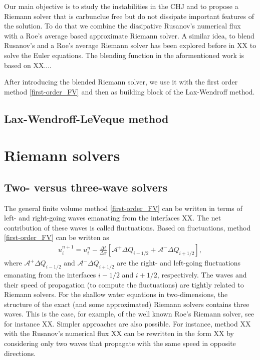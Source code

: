 \documentclass[preprint, 11pt]{article}
\newcommand{\A}{{\mathcal A}}
\begin{document}
Our main objective is to study the instabilities in the CHJ and to propose a Riemann solver
that is carbunclue free but do not dissipate important features of the solution. 
To do that we combine the dissipative Rusanov's numerical flux with a Roe's average based
approximate Riemann solver. A similar idea, to blend Rusanov's and a Roe's average 
Riemann solver has been explored before in XX to solve the Euler equations. The blending 
function in the aformentioned work is based on XX....

After introducing the blended Riemann solver, we use it with the first order method 
\eqref{first-order_FV} and then as building block of the Lax-Wendroff method. 

\subsection{Lax-Wendroff-LeVeque method}

\section{Riemann solvers}

\subsection{Two- versus three-wave solvers}
The general finite volume method \eqref{first-order_FV} can be written in terms of left- 
and right-going waves emanating from the interfaces XX. The net contribution of these waves 
is called fluctuations. Based on fluctuations, method \eqref{first-order_FV} can be written as 
\begin{align}\label{FV_via_fluct}
  u_i^{n+1}=u_i^n-\frac{\Delta t}{\Delta x}\left[\A^+\Delta Q_{i-1/2}+\A^-\Delta Q_{i+1/2}\right],
\end{align}
where $\A^+\Delta Q_{i-1/2}$ and $\A^-\Delta Q_{i+1/2}$ are the right- and left-going fluctuations 
emanating from the interfaces $i-1/2$ and $i+1/2$, respectively.
The waves and their speed of propagation (to compute the fluctuations) are tightly related to 
Riemann solvers. For the shallow water equations in two-dimensions, the structure of the exact (and some 
approximated) Riemann solvers contains three waves. This is the case, for example, of the well known 
Roe's Riemann solver, see for instance XX. Simpler approaches are also possible. For instance, 
method XX with the Rusanov's numerical flux XX can be rewritten in the form XX by considering 
only two waves that propagate with the same speed in opposite directions.
\end{document}
